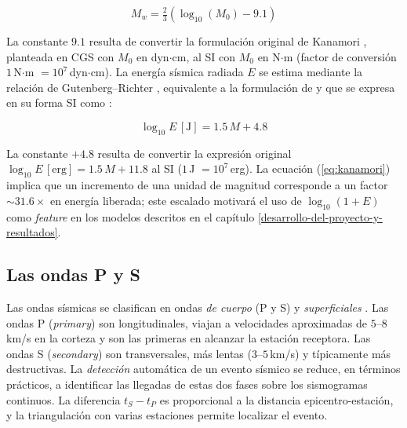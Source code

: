 \begin{equation}
  M_w = \tfrac{2}{3}\left( \log_{10}(M_0) - 9.1\right)
  \label{eq:Mw}
\end{equation}

La constante $9.1$ resulta de convertir la formulación original de Kanamori \citep{hanks1979moment}, planteada en CGS con $M_0$ en dyn$\cdot$cm, al SI con $M_0$ en N$\cdot$m (factor de conversión $1$\,N$\cdot$m $= 10^{7}$\,dyn$\cdot$cm). La energía sísmica radiada $E$ se estima mediante la relación de Gutenberg--Richter \citep{gutenberg1956energy}, equivalente a la formulación de \citet{kanamori1977energy} y que se expresa en su forma SI como \citep{bormann2012nmsop, bormann2011mw}:

\begin{equation}
  \log_{10} E\,[\mathrm{J}] = 1.5\, M + 4.8
  \label{eq:kanamori}
\end{equation}

La constante $+4.8$ resulta de convertir la expresión original $\log_{10} E\,[\mathrm{erg}] = 1.5\,M + 11.8$ \citep{gutenberg1956energy} al SI ($1$\,J $= 10^{7}$\,erg). La ecuación (\ref{eq:kanamori}) implica que un incremento de una unidad de magnitud corresponde a un factor $\sim 31.6\times$ en energía liberada; este escalado motivará el uso de $\log_{10}(1+E)$ como \textit{feature} en los modelos descritos en el capítulo \ref{desarrollo-del-proyecto-y-resultados}.

\subsection{Las ondas P y S}
\label{ondas-p-s}

Las ondas sísmicas se clasifican en ondas \emph{de cuerpo} (P y S) y \emph{superficiales} \citep{shearer2009introduction, stein2003introduction}. Las ondas P (\textit{primary}) son longitudinales, viajan a velocidades aproximadas de $5$--$8$\,km/s en la corteza y son las primeras en alcanzar la estación receptora. Las ondas S (\textit{secondary}) son transversales, más lentas ($3$--$5$\,km/s) y típicamente más destructivas. La \emph{detección} automática de un evento sísmico se reduce, en términos prácticos, a identificar las llegadas de estas dos fases sobre los sismogramas continuos. La diferencia $t_S - t_P$ es proporcional a la distancia epicentro-estación, y la triangulación con varias estaciones permite localizar el evento.

